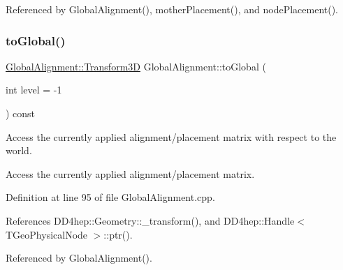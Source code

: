 Referenced by Global\+Alignment(), mother\+Placement(), and node\+Placement().

\hypertarget{class_d_d4hep_1_1_alignments_1_1_global_alignment_a53f3fe1ad33103497a3ac4dca394e33d}{}\label{class_d_d4hep_1_1_alignments_1_1_global_alignment_a53f3fe1ad33103497a3ac4dca394e33d} 
\subsubsection{\texorpdfstring{to\+Global()}{toGlobal()}\hspace{0.1cm}{\footnotesize\ttfamily [1/2]}}
{\footnotesize\ttfamily \hyperlink{class_d_d4hep_1_1_alignments_1_1_global_alignment_a328240cbc53ba92424336a5898ba49d3}{Global\+Alignment\+::\+Transform3D} Global\+Alignment\+::to\+Global (\begin{DoxyParamCaption}\item[{int}]{level = {\ttfamily -\/1} }\end{DoxyParamCaption}) const}



Access the currently applied alignment/placement matrix with respect to the world. 

Access the currently applied alignment/placement matrix. 

Definition at line 95 of file Global\+Alignment.\+cpp.



References D\+D4hep\+::\+Geometry\+::\+\_\+transform(), and D\+D4hep\+::\+Handle$<$ T\+Geo\+Physical\+Node $>$\+::ptr().



Referenced by Global\+Alignment().

\hypertarget{class_d_d4hep_1_1_alignments_1_1_global_alignment_a6a3729f431459bb1592c1760581fd2ce}{}\label{class_d_d4hep_1_1_alignments_1_1_global_alignment_a6a3729f431459bb1592c1760581fd2ce} 
